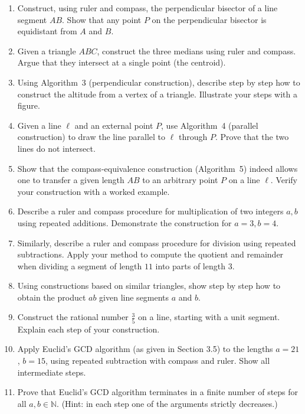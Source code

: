 \begin{enumerate}

  \item Construct, using ruler and compass, the perpendicular bisector of a line segment $AB$. 
  Show that any point $P$ on the perpendicular bisector is equidistant from $A$ and $B$.

  \item Given a triangle $ABC$, construct the three medians using ruler and compass. 
  Argue that they intersect at a single point (the centroid).  

  \item Using Algorithm~3 (perpendicular construction), describe step by step how to construct 
  the altitude from a vertex of a triangle. Illustrate your steps with a figure.

  \item Given a line $\ell$ and an external point $P$, use Algorithm~4 (parallel construction) 
  to draw the line parallel to $\ell$ through $P$. Prove that the two lines do not intersect.

  \item Show that the compass-equivalence construction (Algorithm~5) indeed allows one to 
  transfer a given length $AB$ to an arbitrary point $P$ on a line $\ell$. 
  Verify your construction with a worked example.

  \item Describe a ruler and compass procedure for multiplication of two integers $a, b$ 
  using repeated additions. Demonstrate the construction for $a=3, b=4$.

  \item Similarly, describe a ruler and compass procedure for division using repeated subtractions. 
  Apply your method to compute the quotient and remainder when dividing a segment of length $11$ 
  into parts of length $3$.

  \item Using constructions based on similar triangles, show step by step how to obtain 
  the product $ab$ given line segments $a$ and $b$.

  \item Construct the rational number $\tfrac{3}{5}$ on a line, starting with a unit segment. 
  Explain each step of your construction.

  \item Apply Euclid’s GCD algorithm (as given in Section 3.5) to the lengths $a = 21$, $b = 15$, 
  using repeated subtraction with compass and ruler. Show all intermediate steps.

  \item Prove that Euclid’s GCD algorithm terminates in a finite number of steps for all $a, b \in \mathbb{N}$. 
  (Hint: in each step one of the arguments strictly decreases.)

   

\end{enumerate}

